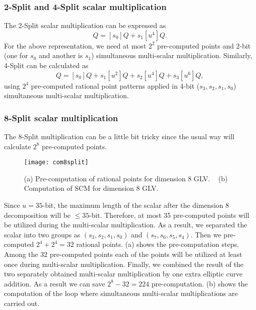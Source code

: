 \subsubsection{2-Split and 4-Split scalar multiplication}
The 2-Split scalar multiplication can be expressed as
\begin{equation}
    [s]Q = [s_0]Q + s_1 [u^4]Q.
\end{equation}
For the above representation, we need at most $2^2$ pre-computed points and 2-bit (one for $s_0$ and another is $s_1$) simultaneous multi-scalar multiplication.
Similarly, 4-Split can be calculated as 
\begin{equation}
    [s]Q = [s_0]Q+s_1[u^2]Q+s_2[u^4]Q+s_3[u^6]Q,
\end{equation}
using $2^4$ pre-computed rational point patterns applied in 4-bit ($s_3,s_2,s_1,s_0$) simultaneous multi-scalar multiplication. 

\subsubsection{8-Split scalar multiplication}
The 8-Split multiplication can be a little bit tricky since the usual way will calculate $2^8$ pre-computed points.
\begin{figure*}
\centering
	\texttt{[image: com8split]}
\caption{(a) Pre-computation of rational points for dimension 8  GLV. ~ (b) Computation of SCM for dimension 8  GLV.}
\label{precom_figure}
\end{figure*}
 Since $u = 35$-bit,  the maximum length of the scalar after the dimension 8 decomposition will be $\leq 35$-bit.
Therefore, at most 35 pre-computed points will be utilized during the  multi-scalar multiplication.
As a result, we separated the scalar into two groups as $(s_3,s_2,s_1,s_0)$ and $(s_7,s_6,s_5,s_4)$.
Then we pre-computed $2^4 + 2^4 = 32$ rational points.
(a) shows the pre-computation steps.  
Among the 32 pre-computed points each of the points will be utilized at least once during multi-scalar multiplication. 
Finally, we combined the result of the two separately  obtained multi-scalar multiplication by one extra elliptic curve addition. 
As a result we can save $2^8-32 = 224$ pre-computation. 
(b) shows the computation of the loop where simultaneous multi-scalar multiplications are carried out. 

